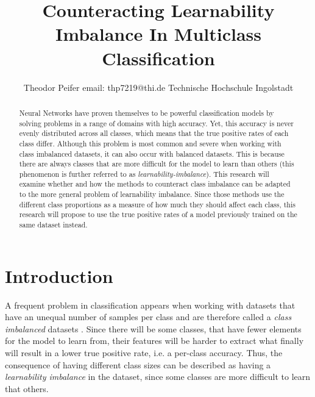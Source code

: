 \documentclass[journal]{IEEEtran}
\begin{document}
 

\title{\textbf{Counteracting Learnability Imbalance In Multiclass Classification}}

\author{Theodor Peifer
        \linebreak
        email: thp7219@thi.de
        \linebreak
        Technische Hochschule Ingolstadt
}

\maketitle

\begin{abstract}
Neural Networks have proven themselves to be powerful classification
models by solving problems in a range of domains with high accuracy.
Yet, this accuracy is never evenly distributed across all classes, which means that the true positive rates of each class differ.
Although this problem is most common and severe when working with class imbalanced datasets, it can also occur with balanced datasets.
This is because there are always classes that are more difficult for the model to learn than others (this phenomenon is further referred to as \emph{learnability-imbalance}).
This research will examine whether and how the methods to counteract class imbalance can be adapted to the more general problem of learnability imbalance.
Since those methods use the different class proportions as a measure of how much they should affect each class, this research will propose
to use the true positive rates of a model previously trained on the same dataset instead.

\end{abstract}


\section{Introduction}
A frequent problem in classification appears when working with datasets that have an unequal number of samples per class and are therefore called a \emph{class imbalanced} datasets \cite{japkowicz2002class}.
Since there will be some classes, that have fewer elements for the model to learn from, their features will be harder to extract what finally will result in a lower true positive rate, i.e. a per-class accuracy.
Thus, the consequence of having different class sizes can be described as having a \emph{learnability imbalance} in the dataset, since some classes are more difficult to learn that others.
\end{document}
